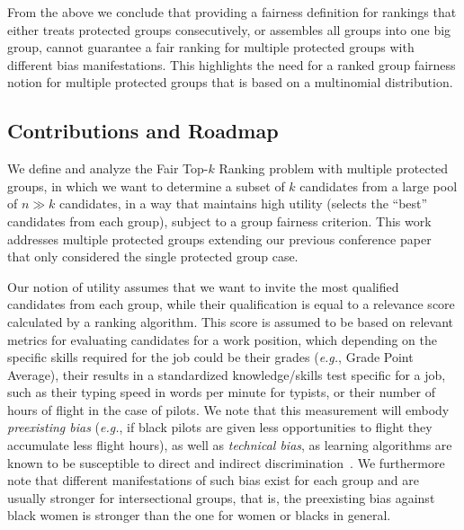 From the above we conclude that providing a fairness definition for rankings that either treats protected groups consecutively, or assembles all groups into one big group, cannot guarantee a fair ranking for multiple protected groups with different bias manifestations.
%
This highlights the need for a ranked group fairness notion for multiple protected groups that is based on a multinomial distribution.
%

\subsection{Contributions and Roadmap}
We define and analyze the {\sc Fair Top-$k$ Ranking problem} with multiple protected groups, in which we want to determine a subset of $k$ candidates from a large pool of $n \gg k$ candidates, in a way that maintains high utility (selects the ``best'' candidates from each group), subject to a group fairness criterion.
%
This work addresses multiple protected groups extending our previous conference paper~\cite{zehlike2017fair} that only considered the single protected group case.
%
%

Our notion of utility assumes that we want to invite the most qualified candidates from each group, while their qualification is equal to a relevance score calculated by a ranking algorithm.
%
This score is assumed to be based on relevant metrics for evaluating candidates for a work position, which depending on the specific skills required for the job could be their grades ({\em e.g.}, Grade Point Average), their results in a standardized knowledge/skills test specific for a job, such as their typing speed in words per minute for typists, or their number of hours of flight in the case of pilots.
%
We note that this measurement will embody \emph{preexisting bias} ({\em e.g.}, if black pilots are given less opportunities to flight they accumulate less flight hours), as well as \emph{technical bias}, as learning algorithms are known to be susceptible to direct and indirect discrimination~\cite{tuto2016,HajianFerrer12}.
%
We furthermore note that different manifestations of such bias exist for each group and are usually stronger for intersectional groups, that is, the preexisting bias against black women is stronger than the one for women or blacks in general.
%

